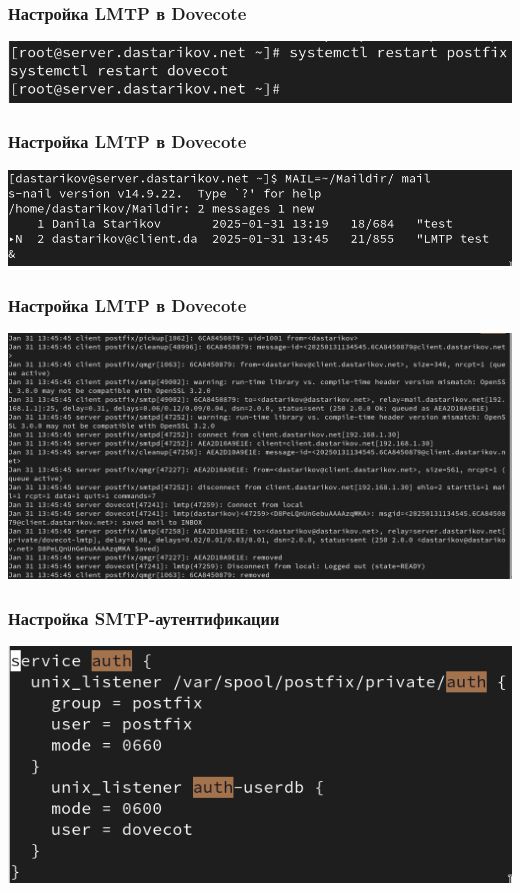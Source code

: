 \begin{frame}
  \frametitle{Настройка LMTP в Dovecote}
  \centering
  \includegraphics[width=\textwidth]{../images/image04.png}
\end{frame}

\begin{frame}
  \frametitle{Настройка LMTP в Dovecote}
  \centering
  \includegraphics[width=\textwidth]{../images/image05.png}
\end{frame}

\begin{frame}
  \frametitle{Настройка LMTP в Dovecote}
  \centering
  \includegraphics[width=\textwidth]{../images/image06.png}
\end{frame}

\begin{frame}
  \frametitle{Настройка SMTP-аутентификации} 
  \centering
  \includegraphics[width=\textwidth]{../images/image08.png}
\end{frame}

